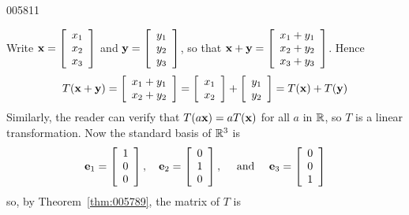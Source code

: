 \begin{example}{}{005811}
\begin{solution}
  Write $\textbf{x} = \left[ \begin{array}{c}
  x_{1} \\
  x_{2} \\
  x_{3}
  \end{array} \right]$
 and $\textbf{y} = \left[ \begin{array}{c}
 y_{1} \\
 y_{2} \\
 y_{3}
 \end{array} \right]$, so that $\textbf{x} + \textbf{y} = \left[ \begin{array}{c}
 x_{1} + y_{1} \\ 
 x_{2} + y_{2} \\
 x_{3} + y_{3}
 \end{array} \right]$. Hence
\begin{equation*}
T(\textbf{x} + \textbf{y}) = \left[ \begin{array}{c}
 x_{1} + y_{1} \\ 
x_{2} + y_{2}
\end{array} \right] = \left[ \begin{array}{c}
x_{1} \\
x_{2}
\end{array} \right] + \left[ \begin{array}{c}
y_{1} \\
y_{2}
\end{array} \right] = T(\textbf{x}) + T(\textbf{y})
\end{equation*}
Similarly, the reader can verify that $T(a\textbf{x}) = aT(\textbf{x})$ for all $a$ in $\mathbb{R}$, so $T$ is a linear transformation. Now the standard basis of $\mathbb{R}^3$ is
\begin{equation*}
\textbf{e}_{1} = \left[ \begin{array}{c}
1 \\
0 \\
0
\end{array} \right], \quad 
\textbf{e}_{2} = \left[ \begin{array}{c}
0 \\
1 \\
0
\end{array} \right], \quad \mbox{ and } \quad
\textbf{e}_{3} = \left[ \begin{array}{c}
0 \\
0 \\
1
\end{array} \right]
\end{equation*}
so, by Theorem~\ref{thm:005789}, the matrix of $T$ is

\end{solution}
\end{example}
